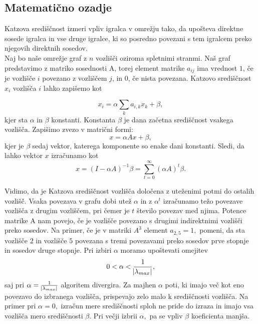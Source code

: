 \documentclass[a4paper]{article}
\begin{document}
\subsection{Matematično ozadje}


\hspace{4.8mm}Katzova središčnost izmeri vpliv igralca v omrežju tako, da upošteva direktne sosede igralca in vse druge igralce, ki so posredno povezani s tem igralcem preko njegovih direktnih sosedov. \\
Naj bo naše omrežje graf z $n$ vozlišči oziroma spletnimi stranmi. Naš graf predstavimo z matriko sosednosti A, torej element matrike $a_{ij}$ ima vrednost $1$, če je vozlišče $i$ povezano z vozliščem $j$, in $0$, če nista povezana. Katzovo središčnost $x_{i}$ vozlišča $i$ lahko zapišemo kot

$$x_{i} = \alpha\sum_{k}a_{i,k}x_{k} + \beta,$$
kjer sta $\alpha$ in $\beta$ konstanti. Konstanta $\beta$ je dana začetna središčnost vsakega vozlišča. Zapišimo zvezo v matrični formi:
$$x = \alpha Ax + \beta,$$
kjer je $\beta$ sedaj vektor, katerega komponente so enake dani konstanti. Sledi, da lahko vektor $x$ izračunamo kot
$$x =  (I - \alpha A)^{-1} \beta= \sum_{t=0}^{\infty} (\alpha A)^t \beta. $$

Vidimo, da je Katzova središčnost vozlišča določena z uteženimi potmi do ostalih vozlišč. Vsaka povezava v grafu dobi utež $\alpha$ in z $\alpha^{t}$ izračunamo težo povezave vozlišča z drugim vozliščem, pri čemer je $t$ število povezav med njima. Potence matrike A nam povejo, če je vozlišče povezano s drugimi indirektnimi vozlišči preko sosedov. Na primer, če je v matriki $A^{3}$ element $a_{2,5}  = 1,$ pomeni, da sta vozlišče $2$ in vozlišče $5$ povezana s tremi povezavami preko sosedov prve stopnje in sosedov druge stopnje.
Pri izbiri $\alpha$ moramo upoštevati omejitev 
$$0 < \alpha < \frac{1}{\abs{\lambda_{max}}},$$
saj pri $\alpha = \frac{1}{\abs{\lambda_{max}}}$ algoritem divergira. Za majhen $\alpha$ poti, ki imajo več kot eno povezavo do izbranega vozlišča, prispevajo zelo malo k središčnosti vozlišča. Na primer pri $\alpha = 0,$ izračun mere središčnosti sploh ne pride do izraza in imajo vsa vozlišča mero središčnosti $\beta.$  Pri večji izbrii $\alpha,$ pa se vpliv $\beta$ koeficienta manjša.
\end{document}
